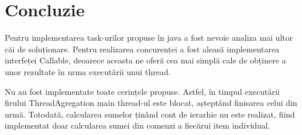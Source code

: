 \section*{Concluzie}

	Pentru implementarea task-urilor propuse în java a fost nevoie analiza mai ultor căi de soluționare. Pentru realizarea concurenței a fost aleasă implementarea interfeței Callable, deoarece aceasta ne oferă cea mai simplă cale de obținere a unor rezultate în urma executării unui thread.
	
	Nu au fost implementate toate cerințele propuse. Astfel, în timpul executării firului ThreadAgregation main thread-ul este blocat, așteptând finisarea celui din urmă. Totodată, calcularea sumelor ținând cont de ierarhie nu este realizat, fiind implementat doar calcularea sumei din comenzi a fiecărui item individual.

\clearpage